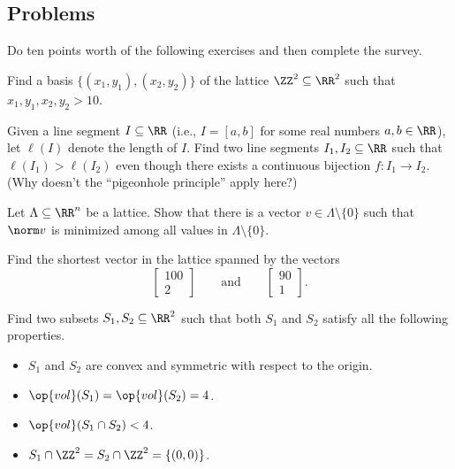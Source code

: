 \documentclass[../notes.tex]{subfiles}
\begin{document}
\subsection{Problems}
Do ten points worth of the following exercises and then complete the survey.
\begin{prob}[1 point]
	Find a basis $\{(x_1,y_1),(x_2,y_2)\}$ of the lattice $\ZZ^2\subseteq\RR^2$ such that $x_1,y_1,x_2,y_2>10$.
\end{prob}
\begin{prob}[1 point]
	Given a line segment $I\subseteq\RR$ (i.e., $I=[a,b]$ for some real numbers $a,b\in\RR$), let $\ell(I)$ denote the length of $I$. Find two line segments $I_1,I_2\subseteq\RR$ such that $\ell(I_1)>\ell(I_2)$ even though there exists a continuous bijection $f\colon I_1\to I_2$. (Why doesn't the ``pigeonhole principle'' apply here?)
\end{prob}
\begin{prob}[2 points]
	Let $\Lambda\subseteq\RR^n$ be a lattice. Show that there is a vector $v\in\Lambda\setminus\{0\}$ such that $\norm v$ is minimized among all values in $\Lambda\setminus\{0\}$.
\end{prob}
\begin{prob}[3 points]
	Find the shortest vector in the lattice spanned by the vectors
	\[\begin{bmatrix}
		100 \\
		2
	\end{bmatrix}\qquad\text{and}\qquad\begin{bmatrix}
		90 \\
		1
	\end{bmatrix}.\]
\end{prob}
\begin{prob}[3 points]
	Find two subsets $S_1,S_2\subseteq\RR^2$ such that both $S_1$ and $S_2$ satisfy all the following properties.
	\begin{itemize}
		\item $S_1$ and $S_2$ are convex and symmetric with respect to the origin.
		\item $\op{vol}(S_1)=\op{vol}(S_2)=4$.
		\item $\op{vol}(S_1\cap S_2)<4$.
		\item $S_1\cap\ZZ^2=S_2\cap\ZZ^2=\{(0,0)\}$.
	\end{itemize}
\end{prob}
\end{document}
